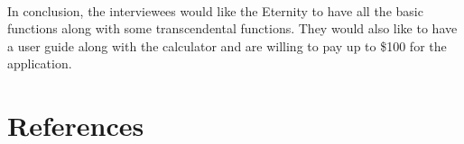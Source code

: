 \documentclass[titlepage]{article}
\begin{document}
        \paragraph{}
        In conclusion, the interviewees would like the Eternity to have all the basic functions along with some transcendental functions. They would also like to have a user guide along with the calculator and are willing to pay up to \$100 for the application.

\newpage
\section{References}
\tiny 

\end{document}
